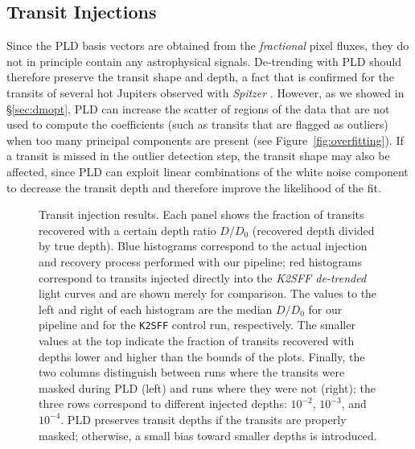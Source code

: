 \documentclass[]{emulateapj}
\begin{document}
\subsection{Transit Injections}
\label{sec:injections}
Since the PLD basis vectors are obtained from the \emph{fractional} pixel fluxes,
they do not in principle contain any astrophysical signals. De-trending with PLD
should therefore preserve the transit shape and depth, a fact that is confirmed
for the transits of several hot Jupiters observed with \emph{Spitzer} \citep{DEM15}.
However, as we showed in \S\ref{sec:dmopt}, PLD can increase the
scatter of regions of the data that are not used to compute the coefficients
(such as transits that are flagged as outliers) when too many principal components 
are present (see Figure~\ref{fig:overfitting}). If a transit is missed in the
outlier detection step, the transit shape may also be affected,
since PLD can exploit linear combinations of the white noise component
to decrease the transit depth and therefore improve the likelihood of the fit.

\begin{figure}[h]
  \begin{center}
       \caption{Transit injection results. Each panel shows the fraction of transits
                recovered with a certain depth ratio $D/D_0$ (recovered depth divided
                by true depth). Blue histograms correspond to the actual injection
                and recovery process performed with our pipeline; red histograms
                correspond to transits injected directly into the \emph{K2SFF de-trended}
                light curves and are shown merely for comparison. The values to the left
                and right of each histogram are the median $D/D_0$ for our pipeline
                and for the \texttt{K2SFF} control run, respectively. The smaller values at the
                top indicate the fraction of transits recovered with depths lower and
                higher than the bounds of the plots. Finally, the two columns distinguish
                between runs where the transits were masked during PLD (left) and runs
                where they were not (right); the three rows correspond to different
                injected depths: $10^{-2}$, $10^{-3}$, and $10^{-4}$. PLD preserves
                transit depths if the transits are properly masked; otherwise, a small bias
                toward smaller depths is introduced.}
     \label{fig:injections}
  \end{center}
\end{figure}
\end{document}
